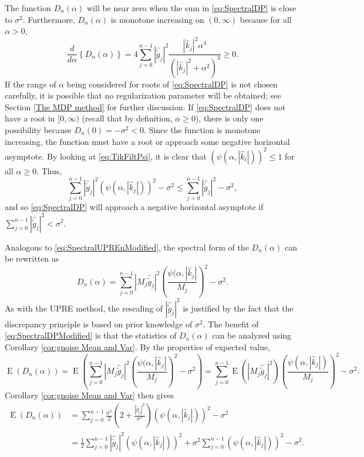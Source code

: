 \documentclass[12pt]{book}
\newcommand{\gnoise}{\widetilde{g}}	%
\newcommand{\regparam}{\alpha}
\newcommand{\mfilt}{\psi}
\newcommand{\noiseSD}{\sigma}	%
\DeclareMathOperator{\E}{E}	%
\newcommand{\D}{D}	%
\begin{document}
The function $\D_n(\regparam)$ will be near zero when the sum in \eqref{eq:SpectralDP} is close to $\noiseSD^2$.  Furthermore, $\D_n(\regparam)$ is monotone increasing on $(0,\infty)$ because for all $\regparam > 0$,
\[\frac{d}{d\regparam}\left\{\D_n(\regparam)\right\} = 4\sum_{j = 0}^{n-1} |\widehat{\gnoise}_j|^2\frac{|\widehat{k}_j|^2\regparam^3}{\left(|\widehat{k}_j|^2 + \regparam^2\right)^3} \geq 0.\]
If the range of $\regparam$ being considered for roots of \eqref{eq:SpectralDP} is not chosen carefully, it is possible that no regularization parameter will be obtained; see Section \ref{The MDP method} for further discussion. If \eqref{eq:SpectralDP} does not have a root in $[0,\infty)$ (recall that by definition, $\regparam \geq 0$), there is only one possibility because $\D_n(0) = -\noiseSD^2 < 0$. Since the function is monotone increasing, the function must have a root or approach some negative horizontal asymptote. By looking at \eqref{eq:TikFiltPsi}, it is clear that $(\mfilt(\regparam,|\widehat{k}_i|))^2 \leq 1$ for all $\regparam \geq 0$. Thus,
\[\sum_{j = 0}^{n-1} |\widehat{\gnoise}_j|^2(\mfilt(\regparam,|\widehat{k}_j|))^2 - \noiseSD^2 \leq \sum_{j = 0}^{n-1} |\widehat{\gnoise}_j|^2 - \noiseSD^2,\]
and so \eqref{eq:SpectralDP} will approach a negative horizontal asymptote if $\sum_{j = 0}^{n-1} |\widehat{\gnoise}_j|^2 < \noiseSD^2$. \par
Analogous to \eqref{eq:SpectralUPREnModified}, the spectral form of the $\D_n(\regparam)$ can be rewritten as
\begin{equation}
\label{eq:SpectralDPModified}
\D_n(\regparam) = \sum_{j = 0}^{n-1} |M_j\widehat{\gnoise}_j|^2\left(\frac{\mfilt(\regparam,|\widehat{k}_j|}{M_j}\right)^2 - \noiseSD^2.
\end{equation}
As with the UPRE method, the rescaling of $|\widehat{\gnoise}_j|^2$ is justified by the fact that the discrepancy principle is based on prior knowledge of $\noiseSD^2$. The benefit of \eqref{eq:SpectralDPModified} is that the statistics of $\D_n(\regparam)$ can be analyzed using Corollary \ref{cor:gnoise Mean and Var}. By the properties of expected value,
\[\E(\D_n(\regparam)) = \E\left(\sum_{j = 0}^{n-1} |M_j\widehat{\gnoise}_j|^2\left(\frac{\mfilt(\regparam,|\widehat{k}_j|}{M_j}\right)^2 - \noiseSD^2\right) = \sum_{j = 0}^{n-1} \E\left(|M_j\widehat{\gnoise}_j|^2\right)\left(\frac{\mfilt(\regparam,|\widehat{k}_j|)}{M_j}\right)^2 - \noiseSD^2.\]
Corollary \ref{cor:gnoise Mean and Var} then gives
\begin{align*}
\E(\D_n(\regparam)) &= \sum_{j = 0}^{n-1} \frac{\noiseSD^2}{2}\left(2 + \frac{|\widehat{g}_j|^2}{\noiseSD^2}\right)(\mfilt(\regparam,|\widehat{k}_j|))^2 - \noiseSD^2 \\
&= \frac{1}{2}\sum_{j = 0}^{n-1} |\widehat{\gnoise}_j|^2(\mfilt(\regparam,|\widehat{k}_j|))^2 + \noiseSD^2\sum_{j = 0}^{n-1} (\mfilt(\regparam,|\widehat{k}_j|))^2 - \noiseSD^2.
\end{align*}
\end{document}
